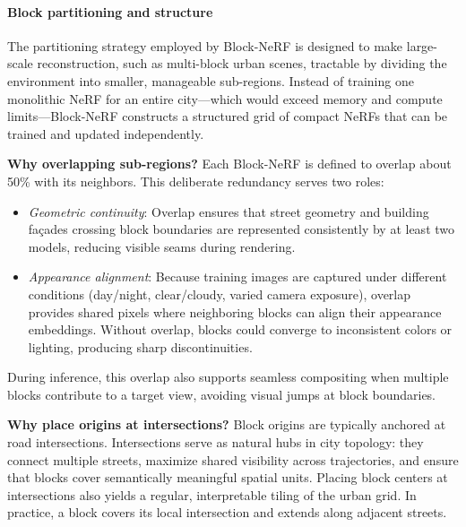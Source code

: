 \begin{enrichment}
\begin{enrichment}
        \paragraph{Block partitioning and structure}
        The partitioning strategy employed by Block-NeRF is designed to make large-scale reconstruction, such as multi-block urban scenes, tractable by dividing the environment into smaller, manageable sub-regions. Instead of training one monolithic NeRF for an entire city---which would exceed memory and compute limits---Block-NeRF constructs a structured grid of compact NeRFs that can be trained and updated independently. 
        
        \textbf{Why overlapping sub-regions?} Each Block-NeRF is defined to overlap about 50\% with its neighbors. This deliberate redundancy serves two roles:
        \begin{itemize}
            \item \emph{Geometric continuity}: Overlap ensures that street geometry and building façades crossing block boundaries are represented consistently by at least two models, reducing visible seams during rendering.
            \item \emph{Appearance alignment}: Because training images are captured under different conditions (day/night, clear/cloudy, varied camera exposure), overlap provides shared pixels where neighboring blocks can align their appearance embeddings. Without overlap, blocks could converge to inconsistent colors or lighting, producing sharp discontinuities.
        \end{itemize}
        During inference, this overlap also supports seamless compositing when multiple blocks contribute to a target view, avoiding visual jumps at block boundaries.
        
        \textbf{Why place origins at intersections?} Block origins are typically anchored at road intersections. Intersections serve as natural hubs in city topology: they connect multiple streets, maximize shared visibility across trajectories, and ensure that blocks cover semantically meaningful spatial units. Placing block centers at intersections also yields a regular, interpretable tiling of the urban grid. In practice, a block covers its local intersection and extends along adjacent streets.
        

\end{enrichment}
\end{enrichment}
